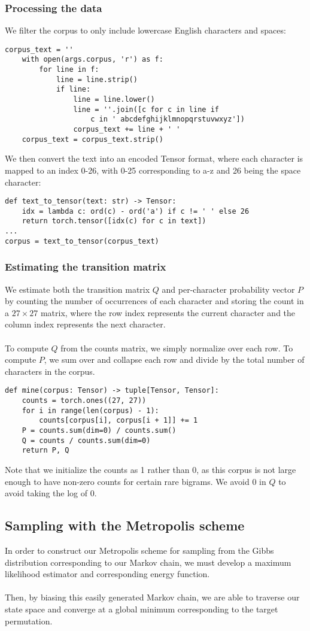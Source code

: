 \documentclass[11pt]{article}
\begin{document}
\subsubsection{Processing the data}
We filter the corpus to only include lowercase English characters and spaces:
\begin{verbatim}
corpus_text = ''
    with open(args.corpus, 'r') as f:
        for line in f:
            line = line.strip()
            if line:
                line = line.lower()
                line = ''.join([c for c in line if
                    c in ' abcdefghijklmnopqrstuvwxyz'])
                corpus_text += line + ' '
    corpus_text = corpus_text.strip()
\end{verbatim}
We then convert the text into an encoded Tensor format, where each character is mapped to an index 0-26, with 0-25 corresponding to a-z and 26 being the space character:
\begin{verbatim}
def text_to_tensor(text: str) -> Tensor:
    idx = lambda c: ord(c) - ord('a') if c != ' ' else 26
    return torch.tensor([idx(c) for c in text])
...
corpus = text_to_tensor(corpus_text)
\end{verbatim}
\subsubsection{Estimating the transition matrix}
We estimate both the transition matrix $Q$ and per-character probability vector $P$ by counting the number of occurrences of each character and storing the count in a $27 \times 27$ matrix, where the row index represents the current character and the column index represents the next character.
\\\\
To compute $Q$ from the counts matrix, we simply normalize over each row. To compute $P$, we sum over and collapse each row and divide by the total number of characters in the corpus.
\begin{verbatim}
def mine(corpus: Tensor) -> tuple[Tensor, Tensor]:
    counts = torch.ones((27, 27))
    for i in range(len(corpus) - 1):
        counts[corpus[i], corpus[i + 1]] += 1
    P = counts.sum(dim=0) / counts.sum()
    Q = counts / counts.sum(dim=0)
    return P, Q
\end{verbatim}
Note that we initialize the counts as 1 rather than 0, as this corpus is not large enough to have non-zero counts for certain rare bigrams. We avoid 0 in $Q$ to avoid taking the log of 0.

\subsection{Sampling with the Metropolis scheme}
In order to construct our Metropolis scheme for sampling from the Gibbs distribution corresponding to our Markov chain, we must develop a maximum likelihood estimator and corresponding energy function.
\\\\
Then, by biasing this easily generated Markov chain, we are able to traverse our state space and converge at a global minimum corresponding to the target permutation.
\end{document}
